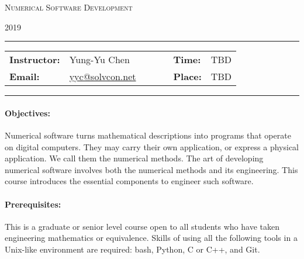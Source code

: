 \documentclass[11pt,a4paper]{article}
\begin{document}
\begin{center}
{\Large \textsc{Numerical Software Development}}
\end{center}
\begin{center}
2019
\end{center}

\begin{center}
\rule{6in}{0.4pt}
\begin{minipage}[t]{.75\textwidth}
\begin{tabular}{llcccll}
\textbf{Instructor:} & Yung-Yu Chen & & &  &
\textbf{Time:} & TBD \\
\textbf{Email:} & \href{mailto:yyc@solvcon.net}{yyc@solvcon.net} & & & &
\textbf{Place:} & TBD
\end{tabular}
\end{minipage}
\rule{6in}{0.4pt}
\end{center}



\paragraph{Objectives:}

Numerical software turns mathematical descriptions into programs that operate
on digital computers.  They may carry their own application, or express a
physical application.  We call them the numerical methods.  The art of
developing numerical software involves both the numerical methods and its
engineering.  This course introduces the essential components to engineer such
software.

\paragraph{Prerequisites:}

This is a graduate or senior level course open to all students who have taken
engineering mathematics or equivalence.  Skills of using all the following
tools in a Unix-like environment are required: bash, Python, C or C++, and Git.
\end{document}
